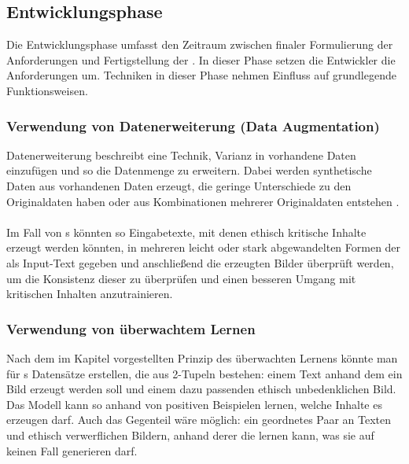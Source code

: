 \documentclass[hidelinks,12pt]{report}
\begin{document}
\subsection{Entwicklungsphase}
Die Entwicklungsphase umfasst den Zeitraum zwischen finaler Formulierung der Anforderungen und Fertigstellung der . In dieser Phase setzen die Entwickler die Anforderungen um. Techniken in dieser Phase nehmen Einfluss auf grundlegende Funktionsweisen.

\subsubsection{Verwendung von Datenerweiterung (Data Augmentation)}
Datenerweiterung beschreibt eine Technik, Varianz in vorhandene Daten einzufügen und so die Datenmenge zu erweitern. Dabei werden synthetische Daten aus vorhandenen Daten erzeugt, die geringe Unterschiede zu den Originaldaten haben oder aus Kombinationen mehrerer Originaldaten entstehen \cite[S. 2]{Shorten}. 
\\\\
Im Fall von s könnten so Eingabetexte, mit denen ethisch kritische Inhalte erzeugt werden könnten, in mehreren leicht oder stark abgewandelten Formen der  als Input-Text gegeben und anschließend die erzeugten Bilder überprüft werden, um die Konsistenz dieser zu überprüfen und einen besseren Umgang mit kritischen Inhalten anzutrainieren.  
\\
\subsubsection{Verwendung von überwachtem Lernen}\label{Supervised Learning}
Nach dem im Kapitel  vorgestellten Prinzip des überwachten Lernens könnte man für s Datensätze erstellen, die aus 2-Tupeln bestehen: einem Text anhand dem ein Bild erzeugt werden soll und einem dazu passenden ethisch unbedenklichen Bild. Das Modell kann so anhand von positiven Beispielen lernen, welche Inhalte es erzeugen darf. Auch das Gegenteil wäre möglich: ein geordnetes Paar an Texten und ethisch verwerflichen Bildern, anhand derer die  lernen kann, was sie auf keinen Fall generieren darf.
\\
\end{document}

